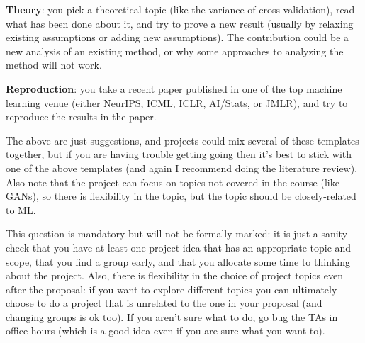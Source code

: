 \documentclass{article}
\def\blu#1{{\color{blu}#1}}
\begin{document}
{\item \textbf{Theory}: you pick a theoretical topic (like the variance of cross-validation), read what has been done about it, and try to prove a new result (usually by relaxing existing assumptions or adding new assumptions). The contribution could be a new analysis of an existing method, or why some approaches to analyzing the method will not work.
\item \textbf{Reproduction}: you take a recent paper published in one of the top machine learning venue (either NeurIPS, ICML, ICLR, AI/Stats, or JMLR), and try to reproduce the results in the paper.
}
The above are just suggestions, and  projects could mix several of these templates together, but if you are having trouble getting going then it's best to stick with one of the above templates (and again I recommend doing the literature review). Also note that the project can focus on topics not covered in the course (like GANs), so there is flexibility in the topic, but the topic should be closely-related to ML.

\blu{This question is mandatory but will not be formally marked: it is just a sanity check that you have at least one project idea that has an appropriate topic and scope, that you find a group early, and that you  allocate some time to thinking about the project.}
Also, there is flexibility in the choice of project topics even after the proposal: if you want to explore different topics you can ultimately choose to do a project that is unrelated to the one in your proposal (and changing groups is ok too). If you aren't sure what to do, go bug the TAs in office hours (which is a good idea even if you are sure what you want to).
\end{document}

